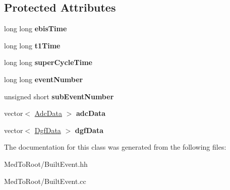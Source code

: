 \subsection*{Protected Attributes}
\begin{DoxyCompactItemize}
\item 
\mbox{\label{class_built_event_a03d3a46cd8ffa584750f814895a36719}} 
long long {\bfseries ebis\+Time}
\item 
\mbox{\label{class_built_event_a7a57667e365324e20b3cd27411bf27a4}} 
long long {\bfseries t1\+Time}
\item 
\mbox{\label{class_built_event_af4382a0a57b77db32d3934fa2764109f}} 
long long {\bfseries super\+Cycle\+Time}
\item 
\mbox{\label{class_built_event_a2492458c6571f5bbbb4d4083b380bf33}} 
long long {\bfseries event\+Number}
\item 
\mbox{\label{class_built_event_aee8cf8caf851007431c754ae7a176d01}} 
unsigned short {\bfseries sub\+Event\+Number}
\item 
\mbox{\label{class_built_event_adeb272a29e4b64150197eb14d8f99d9c}} 
vector$<$ \hyperlink{class_adc_data}{Adc\+Data} $>$ {\bfseries adc\+Data}
\item 
\mbox{\label{class_built_event_acec847a035bef94b9820e31d1d1468ee}} 
vector$<$ \hyperlink{class_dgf_data}{Dgf\+Data} $>$ {\bfseries dgf\+Data}
\end{DoxyCompactItemize}


The documentation for this class was generated from the following files\+:\begin{DoxyCompactItemize}
\item 
Med\+To\+Root/Built\+Event.\+hh\item 
Med\+To\+Root/Built\+Event.\+cc\end{DoxyCompactItemize}
